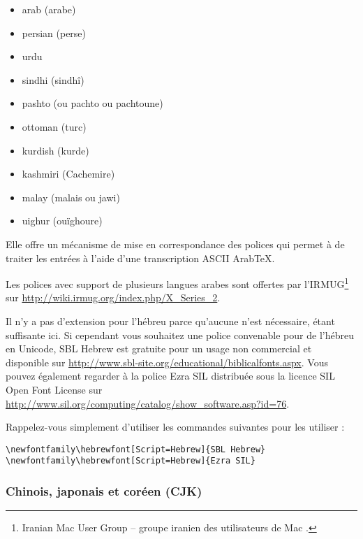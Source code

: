 \begin{itemize}
\item arab (arabe) 
\item persian (perse) 
\item urdu 
\item sindhi (sindhî) 
\item pashto (ou pachto ou pachtoune) 
\item ottoman (turc) 
\item kurdish (kurde) 
\item kashmiri (Cachemire) 
\item malay (malais ou jawi) 
\item uighur (ouïghoure) 
\end{itemize}

Elle offre un mécanisme de mise en correspondance des polices qui
permet à  de traiter les entrées à l'aide d'une
transcription ASCII Arab\TeX.

Les polices avec support de plusieurs langues arabes sont offertes
par l'IRMUG\footnote{Iranian Mac User Group -- groupe iranien des
  utilisateurs de Mac \NdT.} sur
\url{http://wiki.irmug.org/index.php/X_Series_2}.

Il n'y a pas d'extension pour l'hébreu parce qu'aucune
n'est nécessaire,  étant suffisante ici. Si cependant
vous souhaitez une police convenable pour de l'hébreu en Unicode, SBL
Hebrew est gratuite pour un usage non commercial et disponible sur
\url{http://www.sbl-site.org/educational/biblicalfonts.aspx}. Vous
pouvez également regarder à la police Ezra SIL distribuée sous la
licence SIL Open Font License sur
\url{http://www.sil.org/computing/catalog/show_software.asp?id=76}.

Rappelez-vous simplement d'utiliser les commandes suivantes pour les
utiliser :

\begin{lscommand}
\verb|\newfontfamily\hebrewfont[Script=Hebrew]{SBL Hebrew}| \\
\verb|\newfontfamily\hebrewfont[Script=Hebrew]{Ezra SIL}|
\end{lscommand}

\subsubsection{Chinois, japonais et coréen (CJK)}

